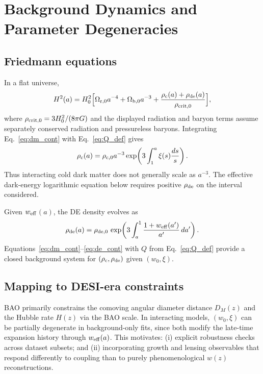 \documentclass[11pt]{article}
\newcommand{\wz}{\ensuremath{w(z)}\xspace}
\newcommand{\weff}{\ensuremath{w_{\rm eff}}\xspace}
\begin{document}
\section{Background Dynamics and Parameter Degeneracies}
\label{sec:background}

\subsection{Friedmann equations}

In a flat universe,
\begin{equation}
H^2(a) = H_0^2\Big[\Omega_{\rm r,0}a^{-4}
+ \Omega_{\rm b,0}a^{-3}
+ \frac{\rho_{\rm c}(a)+\rho_{\rm de}(a)}{\rho_{\rm crit,0}}\Big],
\end{equation}
where $\rho_{\rm crit,0}=3H_0^2/(8\pi G)$ and the displayed radiation and baryon terms assume separately conserved radiation and pressureless baryons. Integrating Eq.~\eqref{eq:dm_cont} with Eq.~\eqref{eq:Q_def} gives
\begin{equation}
\rho_{\rm c}(a)=\rho_{\rm c,0}a^{-3}
\exp\!\left(3\int_1^a \xi(s)\frac{ds}{s}\right).
\end{equation}
Thus interacting cold dark matter does not generally scale as $a^{-3}$. The effective dark-energy logarithmic equation below requires positive $\rho_{\rm de}$ on the interval considered.

Given \weff$(a)$, the DE density evolves as
\begin{equation}
\rho_{\rm de}(a) = \rho_{\rm de,0}\,
\exp\!\left(3\int_a^1 \frac{1+\weff(a')}{a'}\,da'\right).
\label{eq:rde}
\end{equation}
Equations~\eqref{eq:dm_cont}--\eqref{eq:de_cont} with $Q$ from Eq.~\eqref{eq:Q_def} provide a closed background system for $(\rho_{\rm c},\rho_{\rm de})$ given $(w_0,\xi)$.

\subsection{Mapping to DESI-era constraints}

BAO primarily constrains the comoving angular diameter distance $D_M(z)$ and the Hubble rate $H(z)$ via the BAO scale.
In interacting models, $(w_0,\xi)$ can be partially degenerate in background-only fits, since both modify the late-time expansion history through $\weff(a)$.
This motivates: (i) explicit robustness checks across dataset subsets; and (ii) incorporating growth and lensing observables that respond differently to coupling than to purely phenomenological \wz reconstructions.
\end{document}
